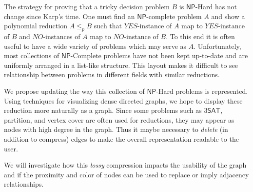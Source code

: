 \documentclass{sigchi}
\newcommand\ClassNP{\mathsf{NP}}
\newcommand\SAT{\mathsf{SAT}}
\begin{document}
The strategy for proving that a tricky decision problem $B$ is $\ClassNP$-Hard has not change since Karp's time. One must find an $\ClassNP$-complete problem $A$ and show a polynomial reduction $A \leq_{p} B$ such that $YES$-instance of $A$ map to $YES$-instance of $B$ and $NO$-instances of $A$ map to $NO$-instance of $B$. To this end it is often useful to have a wide variety of problems which may serve as $A$. Unfortunately, most collections of $\ClassNP$-Complete problems have not been kept up-to-date and are uniformly arranged in a list-like structure. This layout makes it difficult to see relationship between problems in different fields with similar reductions.

We propose updating the way this collection of $\ClassNP$-Hard problems is represented. Using techniques for visualizing dense directed graphs, we hope to display these reduction more naturally as a graph. Since some problems such as $3\SAT$, partition, and vertex cover are often used for reductions, they may appear as nodes with high degree in the graph. Thus it maybe necessary to \emph{delete} (in addition to compress) edges to make the overall representation readable to the user. 

We will investigate how this \emph{lossy} compression impacts the usability of the graph and if the proximity and color of nodes can be used to replace or imply adjacency relationships.
\end{document}
